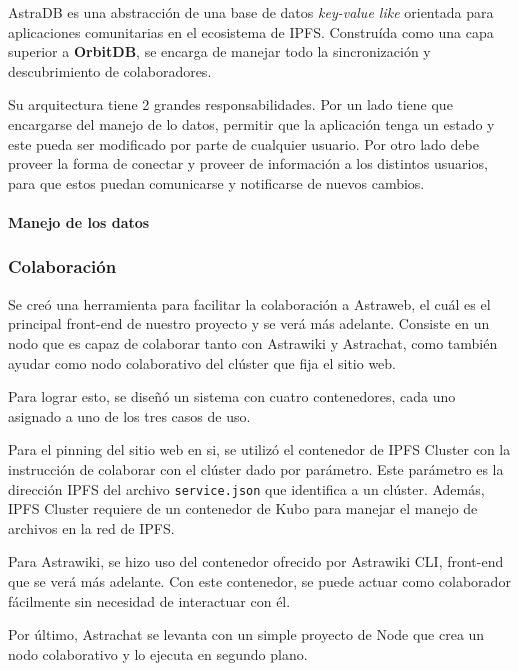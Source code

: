AstraDB es una abstracción de una base de datos \textit{key-value like} orientada para aplicaciones comunitarias en el ecosistema de IPFS. Construída como una capa superior a \textbf{OrbitDB}\cite{orbitdb}, se encarga de manejar todo la sincronización y descubrimiento de colaboradores.

Su arquitectura tiene 2 grandes responsabilidades. Por un lado tiene que encargarse del manejo de lo datos, permitir que la aplicación tenga un estado y este pueda ser modificado por parte de cualquier usuario. Por otro lado debe proveer la forma de conectar y proveer de información a los distintos usuarios, para que estos puedan comunicarse y notificarse de nuevos cambios.

\paragraph{Manejo de los datos}


\subsubsection{Colaboración}

Se creó una herramienta para facilitar la colaboración a Astraweb, el cuál es el principal front-end de nuestro proyecto y se verá más adelante. Consiste en un nodo que es capaz de colaborar tanto con Astrawiki y Astrachat, como también ayudar como nodo colaborativo del clúster que fija el sitio web.

Para lograr esto, se diseñó un sistema con cuatro contenedores, cada uno asignado a uno de los tres casos de uso.

Para el pinning del sitio web en si, se utilizó el contenedor de IPFS Cluster con la instrucción de colaborar con el clúster dado por parámetro. Este parámetro es la dirección IPFS del archivo \texttt{service.json} que identifica a un clúster. Además, IPFS Cluster requiere de un contenedor de Kubo para manejar el manejo de archivos en la red de IPFS.

Para Astrawiki, se hizo uso del contenedor ofrecido por Astrawiki CLI, front-end que se verá más adelante. Con este contenedor, se puede actuar como colaborador fácilmente sin necesidad de interactuar con él.

Por último, Astrachat se levanta con un simple proyecto de Node que crea un nodo colaborativo y lo ejecuta en segundo plano.

